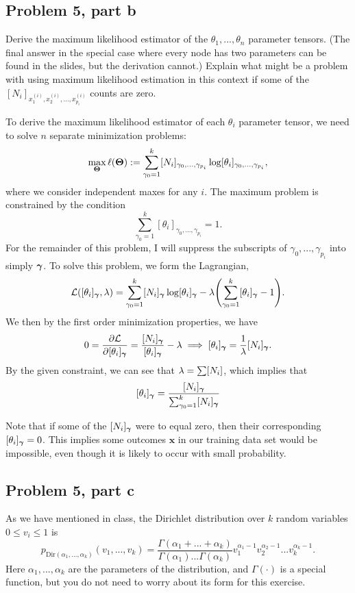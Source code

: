 \subsection{Problem 5, part b}
Derive the maximum likelihood estimator of the $\theta_1, ..., \theta_n$ parameter tensors. (The final answer in the special case where every node has two parameters can be found in the slides, but the derivation cannot.) Explain what might be a problem with using maximum likelihood estimation in this context if some of the $[N_i]_{x_1^{(i)}, x_2^{(i)}, ..., x_{p_i}^{(i)}}$ counts are zero. 
\partbreak
\begin{solution}

    To derive the maximum likelihood estimator of each $\theta_i$ parameter tensor, we need to solve $n$ separate minimization problems:
    \begin{align}
        \max_{\boldsymbol{\Theta}} \ell(\boldsymbol{\Theta}) := \sum_{\gamma_0 = 1}^k[N_i]_{\gamma_0, ..., \gamma_{p_i}}\log [\theta_i]_{\gamma_0, ..., \gamma_{p_i}}, \label{P5b: max prob}
    \end{align}
    where we consider independent maxes for any $i$. The maximum problem is constrained by the condition
    \[\sum_{\gamma_0 = 1}^k [\theta_i]_{\gamma_0, ..., \gamma_{p_i}} = 1.\]
    For the remainder of this problem, I will suppress the subscripts of $\gamma_0, ..., \gamma_{p_i}$ into simply $\boldsymbol{\gamma}$. To solve this problem, we form the Lagrangian, 
    \[\mathcal{L}([\theta_i]_{\boldsymbol{\gamma}}, \mathrm{\lambda}) = \sum_{\gamma_0 = 1}^k [N_i]_{\boldsymbol{\gamma}} \log [\theta_i]_{\boldsymbol{\gamma}} - \mathrm{\lambda} \qty(\sum_{\gamma_0 = 1}^k [\theta_i]_{\boldsymbol{\gamma}} - 1).\]
    We then by the first order minimization properties, we have
    \[0 = \frac{\partial \mathcal{L}}{\partial [\theta_i]_{\boldsymbol{\gamma}}} = \frac{[N_i]_{\boldsymbol{\gamma}}}{[\theta_i]_{\boldsymbol{\gamma}}} - \mathrm{\lambda} \implies [\theta_i]_{\boldsymbol{\gamma}} = \frac{1}{\mathrm{\lambda}}[N_i]_{\boldsymbol{\gamma}}.\]
    By the given constraint, we can see that $\mathrm{\lambda} = \sum [N_i]$, which implies that
    \[[\theta_i]_{\boldsymbol{\gamma}} = \frac{[N_i]_{\boldsymbol{\gamma}}}{\sum_{\gamma_0 = 1}^k [N_i]_{\boldsymbol{\gamma}}}\]

    Note that if some of the $[N_i]_{\boldsymbol{\gamma}}$ were to equal zero, then their corresponding $[\theta_i]_{\boldsymbol{\gamma}} = 0$. This implies some outcomes $\textbf{x}$ in our training data set would be impossible, even though it is likely to occur with small probability. 
\end{solution}
\newcommand{\btheta}{\boldsymbol{\theta}}
\newpage
\subsection{Problem 5, part c}
As we have mentioned in class, the Dirichlet distribution over $k$ random variables $0 \leq v_i \leq 1$ is 
\[p_{\text{Dir}(\alpha_1, ..., \alpha_k)}(v_1, ..., v_k) = \frac{\Gamma(\alpha_1 + ...+\alpha_k)}{\Gamma(\alpha_1) ... \Gamma(\alpha_k)}v_1^{\alpha_1 - 1}v_2^{\alpha_2 - 1}...v_k^{\alpha_k - 1}.\]
Here $\alpha_1,..., \alpha_k$ are the parameters of the distribution, and $\Gamma(\cdot)$ is a special function, but you do not need to worry about its form for this exercise.  


